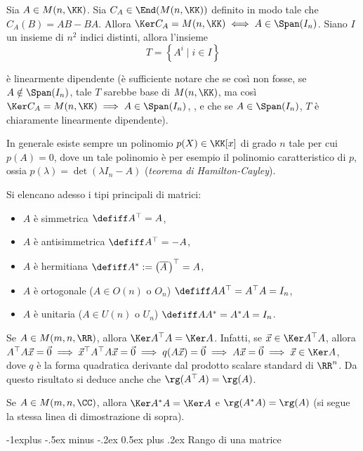 \documentclass[10pt,landscape]{article}
\makeatletter
\renewcommand{\subsection}{\@startsection{subsection}{2}{0mm}%
	{-1explus -.5ex minus -.2ex}%
	{0.5ex plus .2ex}%
	{\normalfont\normalsize\bfseries}}
\makeatother
\begin{document}
\begin{multicols}{3}
		Sia $A \in M(n, \KK)$. Sia $C_A \in \End(M(n, \KK))$ definito in modo
		tale che $C_A(B) = AB - BA$. Allora $\Ker C_A = M(n, \KK)
		\iff A \in \Span(I_n)$. Siano $I$ un insieme di $n^2$ indici
		distinti, allora l'insieme
		\[ T = \left\{ A^i \mid i \in I \right\} \]
		
		è linearmente dipendente (è sufficiente notare che
		se così non fosse, se $A \notin \Span(I_n)$,
		tale $T$ sarebbe base di $M(n, \KK)$, ma
		così $\Ker C_A = M(n, \KK) \implies A \in \Span(I_n)$,
		\Lightning{}, e che se $A \in \Span(I_n)$, $T$
		è chiaramente linearmente dipendente).
		
		In generale esiste sempre un polinomio $p(X) \in \KK[x]$
		di grado $n$ tale per cui $p(A) = 0$, dove un tale polinomio
		è per esempio il polinomio caratteristico di $p$, ossia $p(\lambda)=
		\det(\lambda I_n - A)$ (\textit{teorema di 
			Hamilton-Cayley}).
		
		Si elencano adesso i tipi principali di matrici:
		\begin{itemize}
			\item $A$ è simmetrica $\defiff A^\top = A$,
			\item $A$ è antisimmetrica $\defiff A^\top = -A$,
			\item $A$ è hermitiana $\defiff A^* := \left(\overline{A\,}\right)^\top = A$,
			\item $A$ è ortogonale ($A \in O(n)$ o $O_n$) $\defiff AA^\top = A^\top A = I_n$,
			\item $A$ è unitaria ($A \in U(n)$ o $U_n$) $\defiff AA^* = A^*A = I_n$.
		\end{itemize}
		
		Se $A \in M(m, n, \RR)$, allora $\Ker A^\top A = \Ker A$. Infatti, se $\vec x \in \Ker A^\top A$, allora $A^\top A \vec x = \vec 0 \implies \vec x ^\top A^\top A \vec x = \vec 0 \implies q(A \vec x) = \vec 0 \implies A \vec x = \vec 0 \implies \vec x \in \Ker A$, dove $q$ è la forma quadratica derivante dal prodotto scalare standard
		di $\RR^n$. Da questo risultato si deduce anche che $\rg(A^\top A) = \rg(A)$. \\
		\vskip 0.05in
		
		Se $A \in M(m, n, \CC)$, allora $\Ker A^* A = \Ker A$ e $\rg (A^* A) = \rg(A)$ (si segue la stessa linea
		di dimostrazione di sopra).
		
		\subsection{Rango di una matrice}
		

\end{multicols}
\end{document}

